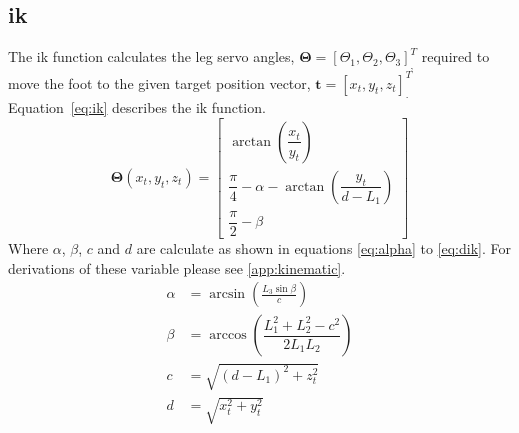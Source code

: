     \subsection{\acf{ik}}
        The \ac{ik} function calculates the leg servo angles, \(\bm{\Theta} = [\Theta_1, \Theta_2, \Theta_3]^T_{\displaystyle ,}\) required
        to move the foot to the given target position vector, \(\bm{t} = [x_t,y_t,z_t]^T_{\displaystyle .}\)
        \hbox{Equation \ref{eq:ik}} describes the \ac{ik} function.
        \begin{equation}\label{eq:ik}
            \bm{\Theta}(x_t,y_t,z_t) =
                                \begin{bmatrix}
                                    \arctan{\left(\dfrac{x_t}{y_t}\right)}\\[0.5cm]
                                    \dfrac{\pi}{4} - \alpha - \arctan{\left(\dfrac{y_t}{d-L_1}\right)}\\[0.5cm]
                                    \dfrac{\pi}{2} - \beta
                                \end{bmatrix}
        \end{equation}
        Where \(\alpha\), \(\beta\), \(c\) and \(d\) are calculate as shown in equations \ref{eq:alpha} to \ref{eq:dik}. For derivations of these variable
        please see \ref{app:kinematic}.
        \begin{align}
            \alpha &= \arcsin{\left(\frac{L_3\sin{\beta}}{c}\right)} \label{eq:alpha} \\[0.5cm]
            \beta &= \arccos{\left(\dfrac{L_1^2 + L_2^2 -c^2}{2L_1L_2}\right)}\\[0.5cm]
            c &= \sqrt{(d-L_1)^2+z_t^2}\\[0.5cm]
            d &= \sqrt{x_t^2 + y_t^2} \label{eq:dik}
        \end{align}
